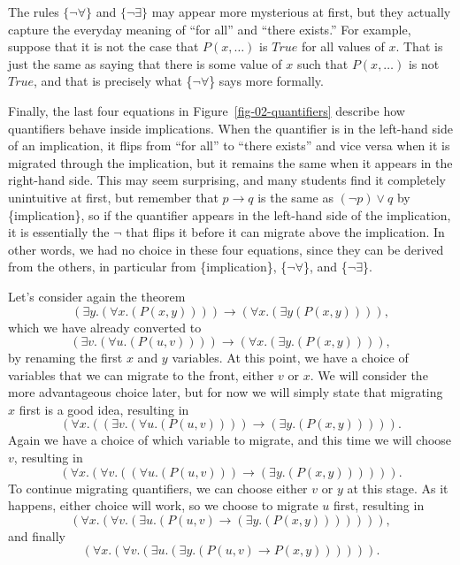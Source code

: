 The rules $\{\neg\forall\}$ and $\{\neg\exists\}$ may appear more mysterious at first, but they actually
capture the everyday meaning of ``for all'' and ``there exists.'' For example, suppose that it is not
the case that $P(x,\dots)$ is $True$ for all values of $x$. That is just the same as saying that there
is some value of $x$ such that $P(x,\dots)$ is not $True$, and that is precisely what 
\{$\neg\forall$\} says more formally.

Finally, the last four equations in Figure~\ref{fig-02-quantifiers} describe how quantifiers behave
inside implications. When the quantifier is in the left-hand side of an implication, it flips from
``for all'' to ``there exists'' and vice versa when it is migrated through the implication, but it remains the same when it appears in the right-hand side. This may seem surprising, and many students
find it completely unintuitive at first, but remember that $p \rightarrow q$ is the same as
$(\neg p) \vee q$ by \{implication\}, so if the quantifier appears in the left-hand side of
the implication, it is essentially the $\neg$ that flips it before it can migrate above the
implication. In other words, we had no choice in these four equations, since they can be derived
from the others, in particular from \{implication\}, \{$\neg\forall$\}, and \{$\neg\exists$\}.

Let's consider again the theorem 
$$(\exists y.(\forall x.(P(x, y)))) \rightarrow (\forall x.(\exists y (P(x, y)))),$$
which we have already converted to
$$(\exists v.(\forall u.(P(u, v)))) \rightarrow (\forall x.(\exists y.(P(x, y)))),$$
by renaming the first $x$ and $y$ variables. At this point, we have a choice of variables that
we can migrate to the front, either $v$ or $x$. We will consider the more advantageous choice
later, but for now we will simply state that migrating $x$ first is a good idea, resulting in
$$(\forall x.((\exists v.(\forall u.(P(u, v)))) \rightarrow (\exists y.(P(x, y))))).$$
Again we have a choice of which variable to migrate, and this time we will choose $v$, resulting in
$$(\forall x.(\forall v.((\forall u.(P(u, v))) \rightarrow (\exists y.(P(x, y)))))).$$
To continue migrating quantifiers, we can choose either $v$ or $y$ at this stage. As it happens,
either choice will work, so we choose to migrate $u$ first, resulting in
$$(\forall x.(\forall v.(\exists u.(P(u, v) \rightarrow (\exists y.(P(x, y))))))),$$
and finally
$$(\forall x.(\forall v.(\exists u.(\exists y.(P(u, v) \rightarrow P(x, y)))))).$$

